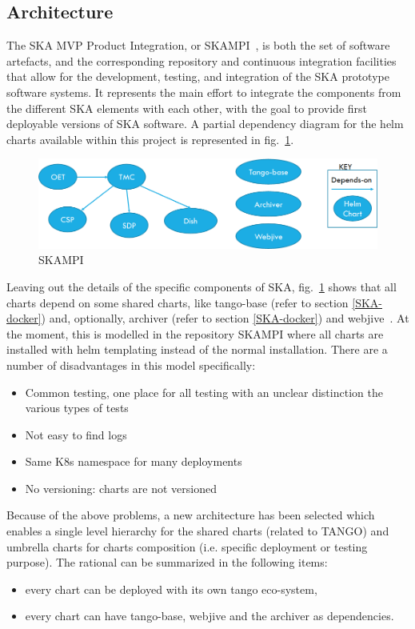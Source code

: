 \documentclass[a4paper]{spie}  %
\begin{document}
\subsection{Architecture}

The SKA MVP Product Integration, or SKAMPI~\cite{SKAMPI}, is both the set of software artefacts, and the corresponding repository and continuous integration facilities that allow for the development, testing, and integration of the SKA prototype software systems. It represents the main effort to integrate the components from the different SKA elements with each other, with the goal to provide first deployable versions of SKA software. A partial dependency diagram for the helm charts available within this project is represented in fig.~\ref{fig:skampi}.

\begin{figure}[!htb]
   \centering
   \includegraphics*[width=1\columnwidth]{simple_skampi}
   \caption{SKAMPI}
   \label{fig:skampi}
\end{figure}

Leaving out the details of the specific components of SKA, fig.~\ref{fig:skampi} shows that all charts depend on some shared charts, like tango-base (refer to section \ref{SKA-docker}) and, optionally, archiver (refer to section \ref{SKA-docker}) and webjive~\cite{webjive}.
At the moment, this is modelled in the repository SKAMPI where all charts are installed with helm templating instead of the normal installation. There are a number of disadvantages in this model specifically:

\begin{itemize}
    \item Common testing, one place for all testing with an unclear distinction the various types of tests
    \item Not easy to find logs
    \item Same K8s namespace for many deployments
    \item No versioning: charts are not versioned
\end{itemize}

Because of the above problems, a new architecture has been selected which enables a single level hierarchy for the shared charts (related to TANGO) and umbrella charts for charts composition (i.e. specific deployment or testing purpose). The rational can be summarized in the following items:
\begin{itemize}
    \item every chart can be deployed with its own tango eco-system,
    \item every chart can have tango-base, webjive and the archiver as dependencies.
\end{itemize}
\end{document}
